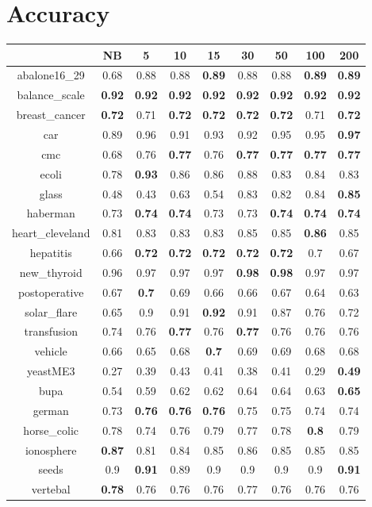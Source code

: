 \documentclass{article}%
\begin{document}
%
\normalsize%
\section*{Accuracy}%
\begin{tabular}{c|cccccccc}%
\hline%
&NB&5&10&15&30&50&100&200\\%
\hline%
abalone16\_29&0.68&0.88&0.88&\textbf{0.89}&0.88&0.88&\textbf{0.89}&\textbf{0.89}\\%
\hline%
balance\_scale&\textbf{0.92}&\textbf{0.92}&\textbf{0.92}&\textbf{0.92}&\textbf{0.92}&\textbf{0.92}&\textbf{0.92}&\textbf{0.92}\\%
\hline%
breast\_cancer&\textbf{0.72}&0.71&\textbf{0.72}&\textbf{0.72}&\textbf{0.72}&\textbf{0.72}&0.71&\textbf{0.72}\\%
\hline%
car&0.89&0.96&0.91&0.93&0.92&0.95&0.95&\textbf{0.97}\\%
\hline%
cmc&0.68&0.76&\textbf{0.77}&0.76&\textbf{0.77}&\textbf{0.77}&\textbf{0.77}&\textbf{0.77}\\%
\hline%
ecoli&0.78&\textbf{0.93}&0.86&0.86&0.88&0.83&0.84&0.83\\%
\hline%
glass&0.48&0.43&0.63&0.54&0.83&0.82&0.84&\textbf{0.85}\\%
\hline%
haberman&0.73&\textbf{0.74}&\textbf{0.74}&0.73&0.73&\textbf{0.74}&\textbf{0.74}&\textbf{0.74}\\%
\hline%
heart\_cleveland&0.81&0.83&0.83&0.83&0.85&0.85&\textbf{0.86}&0.85\\%
\hline%
hepatitis&0.66&\textbf{0.72}&\textbf{0.72}&\textbf{0.72}&\textbf{0.72}&\textbf{0.72}&0.7&0.67\\%
\hline%
new\_thyroid&0.96&0.97&0.97&0.97&\textbf{0.98}&\textbf{0.98}&0.97&0.97\\%
\hline%
postoperative&0.67&\textbf{0.7}&0.69&0.66&0.66&0.67&0.64&0.63\\%
\hline%
solar\_flare&0.65&0.9&0.91&\textbf{0.92}&0.91&0.87&0.76&0.72\\%
\hline%
transfusion&0.74&0.76&\textbf{0.77}&0.76&\textbf{0.77}&0.76&0.76&0.76\\%
\hline%
vehicle&0.66&0.65&0.68&\textbf{0.7}&0.69&0.69&0.68&0.68\\%
\hline%
yeastME3&0.27&0.39&0.43&0.41&0.38&0.41&0.29&\textbf{0.49}\\%
\hline%
bupa&0.54&0.59&0.62&0.62&0.64&0.64&0.63&\textbf{0.65}\\%
\hline%
german&0.73&\textbf{0.76}&\textbf{0.76}&\textbf{0.76}&0.75&0.75&0.74&0.74\\%
\hline%
horse\_colic&0.78&0.74&0.76&0.79&0.77&0.78&\textbf{0.8}&0.79\\%
\hline%
ionosphere&\textbf{0.87}&0.81&0.84&0.85&0.86&0.85&0.85&0.85\\%
\hline%
seeds&0.9&\textbf{0.91}&0.89&0.9&0.9&0.9&0.9&\textbf{0.91}\\%
\hline%
vertebal&\textbf{0.78}&0.76&0.76&0.76&0.77&0.76&0.76&0.76\\%
\hline%
\end{tabular}
\end{document}
